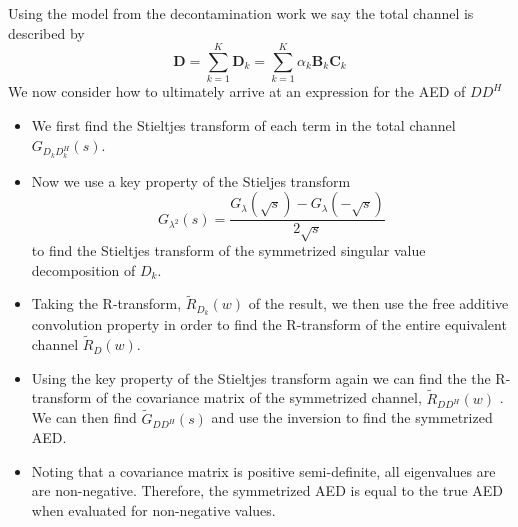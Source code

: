 \documentclass[12pt,a4paper]{report}
\begin{document}
Using the model from the decontamination work we say the total channel is described by 
\begin{equation}
\mathbf{D} = \sum_{k=1}^{K}\mathbf{D}_k = \sum_{k=1}^{K} \alpha_k \mathbf{B}_k \mathbf{C}_k
\end{equation}
We now consider how to ultimately arrive at an expression for the AED of $DD^H$
\begin{itemize}

\item 
	We first find the Stieltjes transform of each term in the total channel $G_{D_kD_k^H}(s)$.
\item
	Now we use a key property of the Stieljes transform
	\begin{equation}
	G_{\lambda^2}(s) = \frac{G_{\lambda}(\sqrt{s})- G_{\lambda}(-\sqrt{s})}{2\sqrt{s}}
	\end{equation}
	to find the Stieltjes transform of the symmetrized singular value decomposition of $D_k$.
\item
	Taking the R-transform, $\tilde{R}_{D_k}(w)$ of the result, we then use the free additive convolution property in order to 
	find the R-transform of the entire equivalent channel $\tilde{R}_{D}(w)$. 
\item
	Using the key property of the Stieltjes transform again we can find the the R-transform of the 
	covariance matrix of the symmetrized channel, $\tilde{R}_{DD^H}(w)$ . We can then find $\tilde{G}_{DD^H}(s)$ and 
	use the inversion to find the symmetrized AED.

\item 
	Noting that a covariance matrix is positive semi-definite, all eigenvalues are are non-negative. Therefore,
	the symmetrized AED is equal to the true AED when evaluated for non-negative values. 

\end{itemize}
\end{document}
